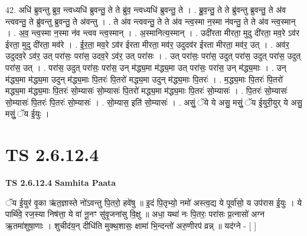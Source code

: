 \documentclass[17pt]{extarticle}
\begin{document}
42. अधि॑ ब्रुवन्तु ब्रुव॒ न्त्वध्यधि॑ ब्रुवन्तु॒ ते ते ब्रु॑व॒ न्त्वध्यधि॑ ब्रुवन्तु॒ ते । . ब्रु॒व॒न्तु॒ ते ते ब्रु॑वन्तु ब्रुवन्तु॒ ते अ॑व न्त्ववन्तु॒ ते ब्रु॑वन्तु ब्रुवन्तु॒ ते अ॑वन्तु । . ते अ॑व न्त्ववन्तु॒ ते ते अ॑व न्त्व॒स्मा न॒स्मा न॑वन्तु॒ ते ते अ॑व न्त्व॒स्मान् । . अ॒व॒ न्त्व॒स्मा न॒स्मा न॑व न्त्वव न्त्व॒स्मान् । . अ॒स्मानित्य॒स्मान् । . उदी॑रता मीरता॒ मुदु दी॑रता॒ मव॒रे ऽव॑र ईरता॒ मुदु दी॑रता॒ मव॑रे । . ई॒र॒ता॒ मव॒रे ऽव॑र ईरता मीरता॒ मव॑र॒ उदुदव॑र ईरता मीरता॒ मव॑र॒ उत् । . अव॑र॒ उदुदव॒रे ऽव॑र॒ उत् परा॑सः॒ परा॑स॒ उदव॒रे ऽव॑र॒ उत् परा॑सः । . उत् परा॑सः॒ परा॑स॒ उदुत् परा॑स॒ उदुत् परा॑स॒ उदुत् परा॑स॒ उत् । . परा॑स॒ उदुत् परा॑सः॒ परा॑स॒ उन् म॑द्ध्य॒मा म॑द्ध्य॒मा उत् परा॑सः॒ परा॑स॒ उन् म॑द्ध्य॒माः । . उन् म॑द्ध्य॒मा म॑द्ध्य॒मा उदुन् म॑द्ध्य॒माः पि॒तरः॑ पि॒तरो॑ मद्ध्य॒मा उदुन् म॑द्ध्य॒माः पि॒तरः॑ । . म॒द्ध्य॒माः पि॒तरः॑ पि॒तरो॑ मद्ध्य॒मा म॑द्ध्य॒माः पि॒तरः॑ सो॒म्यासः॑ सो॒म्यासः॑ पि॒तरो॑ मद्ध्य॒मा म॑द्ध्य॒माः पि॒तरः॑ सो॒म्यासः॑ । . पि॒तरः॑ सो॒म्यासः॑ सो॒म्यासः॑ पि॒तरः॑ पि॒तरः॑ सो॒म्यासः॑ । . सो॒म्यास॒ इति॑ सो॒म्यासः॑ । . असुं॒ ॅये ये असु॒ मसुं॒ ॅय ई॒युरी॒युर् ये असु॒ मसुं॒ ॅय ई॒युः । \newline
\pagebreak
{}
\section*{ TS 2.6.12.4 }

\textbf{TS 2.6.12.4 } \newline
\textbf{Samhita Paata} \newline

ॅय ई॒युर॑ वृ॒का ऋ॑त॒ज्ञास्ते नो॑ऽवन्तु पि॒तरो॒ हवे॑षु ॥ इ॒दं पि॒तृभ्यो॒ नमो॑ अस्त्व॒द्य ये पूर्वा॑सो॒ य उप॑रास ई॒युः । ये पार्थि॑वे॒ रज॒स्या निष॑त्ता॒ ये वा॑ नू॒नꣳ सु॑वृ॒जना॑सु वि॒क्षु ॥ अधा॒ यथा॑ नः पि॒तरः॒ परा॑सः प्र॒त्नासो॑ अग्न ऋ॒तमा॑शुषा॒णाः । शुचीद॑य॒न् दीधि॑ति मुक्थ॒शासः॒ क्षामा॑ भि॒न्दन्तो॑ अरु॒णीरप॑ व्रन्न् ॥ यद॑ग्ने - [  ] \newline
\end{document}
